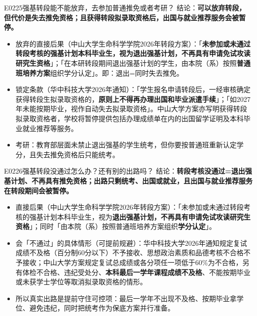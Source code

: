 \begin{qa}{E0225}{强基转段能不能放弃，去参加普通推免或者考研？}
结论：\textbf{可以放弃转段，但代价是失去推免资格；且获得转段拟录取资格后，出国与就业推荐服务会被暂停。}
\begin{itemize}
  \item 放弃的直接后果（中山大学生命科学学院2026年转段方案）：「\textbf{未参加或未通过转段考核的强基计划本科毕业生，视为退出强基计划，不再具有申请免试攻读研究生资格}」；「在本研转段期间退出强基计划的学生，由本院（系）按照\textbf{普通班培养方案}组织学分认定」。即：退出=同时失去推免。
  \item 锁定条款（华中科技大学2026年通知）：「学生报名申请转段后，一经审核确定获得转段生拟录取资格的，\textbf{原则上不得再办理出国和毕业派遣手续}」；「如2027年未能按期毕业，视作自动失去拟录取资格」。中山大学方案亦写明获得转段拟录取资格者，学校将暂停提供包括办理成绩单在内的出国留学证明及本科毕业就业推荐等服务。
  \item 考研：教育部层面未禁止退出强基的学生统考，但你要按普通班重新认定学分，且失去推免资格后只能统考。
\end{itemize}
\end{qa}

\begin{qa}{E0226}{强基转段没通过怎么办？还有别的出路吗？}
结论：\textbf{转段考核没通过=退出强基计划、不再具有推免资格；出路只剩统考、出国或就业，且出国与就业推荐服务在转段期间会被暂停。}
\begin{itemize}
  \item 直接后果（中山大学生命科学学院2026年转段方案）：「未参加或未通过转段考核的强基计划本科毕业生，视为\textbf{退出强基计划，不再具有申请免试攻读研究生资格}」；同时「由本院（系）按照普通班培养方案组织\textbf{学分认定}」。
  \item 会「不通过」的具体情形（可提前规避）：华中科技大学2026年通知规定复试成绩不及格（百分制60分以下）不予接收、思想政治素质和品德考核不合格不予接收；中山大学方案规定复试总成绩或各分项任一项低于60\%为不合格，另有体检不合格、违纪受处分、\textbf{本科最后一学年课程成绩不及格}、不能按期毕业或未获学士学位等取消拟录取资格的情形。
  \item 所以真实出路是提前守住可控项：最后一学年不出现不及格、按期毕业拿学位、避免违纪，同时把统考作为保底方案并行准备。
\end{itemize}
\end{qa}

